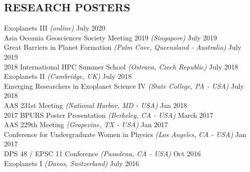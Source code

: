 \documentclass[margin]{res}
\begin{document}
\begin{resume}
\section{\normalfont RESEARCH POSTERS}
Exoplanets III \textit{(online)} \hfill July 2020 \\
Asia Oceania Geosciences Society Meeting 2019 \textit{(Singapore)} \hfill July 2019 \\
Great Barriers in Planet Formation \textit{(Palm Cove, Queensland - Australia)} \hfill July 2019 \\ 
2018 International HPC Summer School \textit{(Ostrava, Czech Republic)} \hfill July 2018 \\
Exoplanets II \textit{(Cambridge, UK)} \hfill July 2018 \\
Emerging Researchers in Exoplanet Science IV \textit{(State College, PA - USA)} \hfill July 2018 \\
AAS 231st Meeting \textit{(National Harbor, MD - USA)} \hfill Jan 2018 \\
2017 BPURS Poster Presentation \textit{(Berkeley, CA - USA)} \hfill March 2017 \\
AAS 229th Meeting \textit{(Grapevine, TX - USA)} \hfill Jan 2017 \\
Conference for Undergraduate Women in Physics \textit{(Los Angeles, CA - USA)} \hfill Jan 2017 \\
DPS 48 / EPSC 11 Conference \textit{(Pasadena, CA - USA)} \hfill Oct 2016 \\
Exoplanets I \textit{(Davos, Switzerland)} \hfill July 2016 \\

\end{resume}
\end{document}
